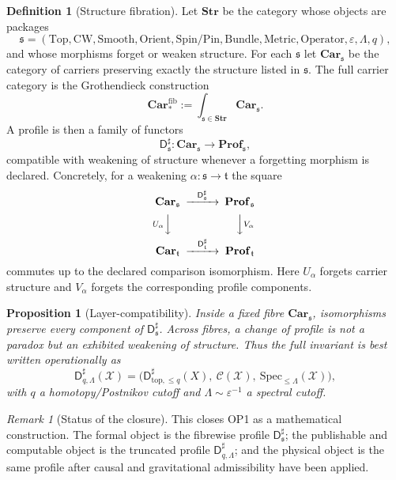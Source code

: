 \documentclass[11pt,a4paper]{article}
\newtheorem{proposition}[theorem]{Proposition}
\theoremstyle{definition}
\newtheorem{definition}[theorem]{Definition}
\theoremstyle{remark}
\newtheorem{remark}[theorem]{Remark}
\newcommand{\Dsharp}{\mathsf{D}^{\sharp}}
\newcommand{\Car}{\mathbf{Car}}
\begin{document}
\begin{definition}[Structure fibration]
Let $\mathbf{Str}$ be the category whose objects are packages
\[
\mathfrak s=(\mathrm{Top},\mathrm{CW},\mathrm{Smooth},\mathrm{Orient},
\mathrm{Spin/Pin},\mathrm{Bundle},\mathrm{Metric},\mathrm{Operator},\varepsilon,
\Lambda,q),
\]
and whose morphisms forget or weaken structure.  For each $\mathfrak s$ let
$\Car_{\mathfrak s}$ be the category of carriers preserving exactly the structure listed in
$\mathfrak s$.  The full carrier category is the Grothendieck construction
\[
\Car_{*}^{\mathrm{fib}}:=\int_{\mathfrak s\in\mathbf{Str}}\Car_{\mathfrak s}.
\]
A profile is then a family of functors
\[
\Dsharp_{\mathfrak s}:\Car_{\mathfrak s}\longrightarrow \mathbf{Prof}_{\mathfrak s},
\]
compatible with weakening of structure whenever a forgetting morphism is declared.  Concretely,
for a weakening $\alpha:\mathfrak s\to\mathfrak t$ the square
\[
\begin{CD}
\Car_{\mathfrak s} @>{\Dsharp_{\mathfrak s}}>> \mathbf{Prof}_{\mathfrak s}\\
@V{U_\alpha}VV @VV{V_\alpha}V\\
\Car_{\mathfrak t} @>{\Dsharp_{\mathfrak t}}>> \mathbf{Prof}_{\mathfrak t}
\end{CD}
\]
commutes up to the declared comparison isomorphism.  Here $U_\alpha$ forgets carrier structure
and $V_\alpha$ forgets the corresponding profile components.
\end{definition}

\begin{proposition}[Layer-compatibility]
Inside a fixed fibre $\Car_{\mathfrak s}$, isomorphisms preserve every component of
$\Dsharp_{\mathfrak s}$.  Across fibres, a change of profile is not a paradox but an exhibited
weakening of structure.  Thus the full invariant is best written operationally as
\[
\Dsharp_{q,\Lambda}(\mathcal X)=
\big(\mathsf{D}^{\sharp}_{\mathrm{top},\le q}(X),\ \mathcal C(\mathcal X),\
\mathrm{Spec}_{\le\Lambda}(\mathcal X)\big),
\]
with $q$ a homotopy/Postnikov cutoff and $\Lambda\sim\varepsilon^{-1}$ a spectral cutoff.
\end{proposition}

\begin{remark}[Status of the closure]
This closes OP1 as a mathematical construction.  The formal object is the fibrewise profile
$\Dsharp_{\mathfrak s}$; the publishable and computable object is the truncated profile
$\Dsharp_{q,\Lambda}$; and the physical object is the same profile after causal and
gravitational admissibility have been applied.
\end{remark}
\end{document}
